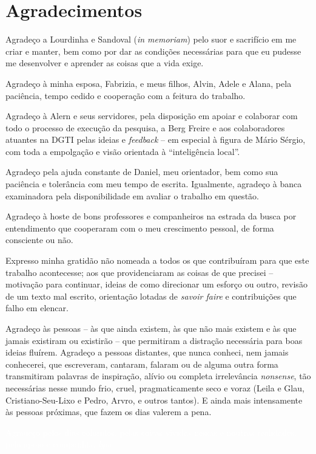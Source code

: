 \chapter*{Agradecimentos}

Agradeço a Lourdinha e Sandoval (\textit{in memoriam}) pelo suor e sacrifício em me criar e manter, bem como por dar as condições necessárias para que eu pudesse me desenvolver e aprender as coisas que a vida exige.

Agradeço à minha esposa, Fabrizia, e meus filhos, Alvin, Adele e Alana, pela paciência, tempo cedido e cooperação com a feitura do trabalho.

Agradeço à Alern e seus servidores, pela disposição em apoiar e colaborar com todo o processo de execução da pesquisa, a Berg Freire e aos colaboradores atuantes na DGTI pelas ideias e \textit{feedback} -- em especial à figura de Mário Sérgio, com toda a empolgação e visão orientada à ``inteligência local''.

Agradeço pela ajuda constante de Daniel, meu orientador, bem como sua paciência e tolerância com meu tempo de escrita. Igualmente, agradeço à banca examinadora pela disponibilidade em avaliar o trabalho em questão.

Agradeço à hoste de bons professores e companheiros na estrada da busca por entendimento que cooperaram com o meu crescimento pessoal, de forma consciente ou não.

Expresso minha gratidão não nomeada a todos os que contribuíram para que este trabalho acontecesse; aos que providenciaram as coisas de que precisei --  motivação para continuar, ideias de como direcionar um esforço ou outro, revisão de um texto mal escrito, orientação lotadas de \textit{savoir faire} e contribuições que falho em elencar.

Agradeço às pessoas  -- às que ainda existem, às que não mais existem e às que jamais existiram ou existirão -- que permitiram a distração necessária para boas ideias fluírem. Agradeço a pessoas distantes, que nunca conheci, nem jamais conhecerei, que escreveram, cantaram, falaram ou de alguma outra forma transmitiram palavras de inspiração, alívio ou completa irrelevância \textit{nonsense}, tão necessárias nesse mundo frio, cruel, pragmaticamente seco e voraz (Leila e Glau, Cristiano-Seu-Lixo e Pedro, Arvro, e outros tantos). E ainda mais intensamente às pessoas próximas, que fazem os dias valerem a pena.

\textcolor{white}{Agradeço pelos dias coloridos, pelas coisas vividas nessas e noutras realidades, pelo apoio e companhia. \textit{lym}}